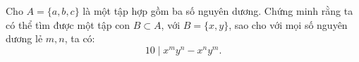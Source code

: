 \ifshowproblem
\begin{problem}\label{example:EMC-2015-S-P1}
    Cho \( A = \{a, b, c\} \) là một tập hợp gồm ba số nguyên dương.  
    Chứng minh rằng ta có thể tìm được một tập con \( B \subset A \), với \( B = \{x, y\} \), sao cho với mọi số nguyên dương lẻ \( m, n \), ta có:
    \[
        10 \mid x^m y^n - x^n y^m.
    \]
\end{problem}
\fi

\fi